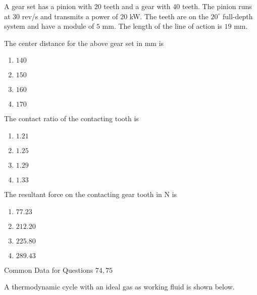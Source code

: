                         
                        A gear set has a pinion with $20$ teeth and a gear with $40$ teeth. The pinion runs at $30$ rev/s and transmits a power of $20$ kW. The teeth are on the $20^\circ$ full-depth system and have a module of $5$ mm. The length of the line of action is $19$ mm.
                            \item The center distance for the above gear set in mm is
                            \begin{enumerate}
                                \item $140$
                                \item $150$
                                \item $160$
                                \item $170$
                            \end{enumerate}
                            
                            \item The contact ratio of the contacting tooth is
                            \begin{enumerate}
                                \item $1.21$
                                \item $1.25$
                                \item $1.29$
                                \item $1.33$
                            \end{enumerate}
                            
                            \item The resultant force on the contacting gear tooth in N is
                            \begin{enumerate}
                                \item $77.23$
                                \item $212.20$
                                \item $225.80$
                                \item $289.43$
                            \end{enumerate}
                        Common Data for Questions $74,75$


                        A thermodynamic cycle with an ideal gas as working fluid is shown below.
                        
                        
